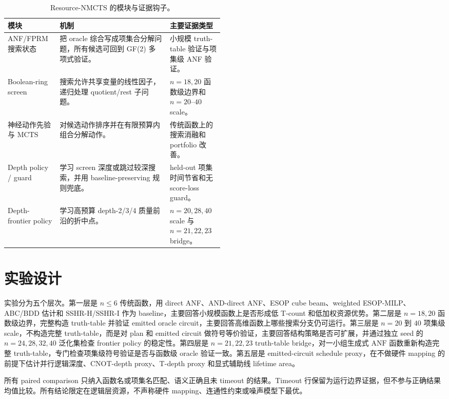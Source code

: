 \documentclass[UTF8,fontset=macnew,11pt]{ctexart}
\newcommand{\method}{Resource-NMCTS}
\newcommand{\anf}{\ensuremath{\mathrm{ANF}}}
\newcommand{\mcts}{\ensuremath{\mathrm{MCTS}}}
\newcommand{\ttable}{truth-table}
\begin{document}
\begin{table}[H]
\centering
\small
\caption{\method{} 的模块与证据钩子。}
\label{tab:modules}
\begin{tabularx}{\linewidth}{>{\raggedright\arraybackslash}p{0.24\linewidth}>{\raggedright\arraybackslash}X>{\raggedright\arraybackslash}p{0.25\linewidth}}
\toprule
模块 & 机制 & 主要证据类型 \\
\midrule
ANF/FPRM 搜索状态 & 把 oracle 综合写成项集合分解问题，所有候选可回到 GF(2) 多项式验证。 & 小规模 truth-table 验证与项集级 ANF 验证。 \\
Boolean-ring screen & 搜索允许共享变量的线性因子，递归处理 quotient/rest 子问题。 & $n=18,20$ 函数级边界和 $n=20$--$40$ scale。 \\
神经动作先验与 \mcts{} & 对候选动作排序并在有限预算内组合分解动作。 & 传统函数上的搜索消融和 portfolio 改善。 \\
Depth policy / guard & 学习 screen 深度或跳过较深搜索，并用 baseline-preserving 规则兜底。 & held-out 项集时间节省和无 score-loss guard。 \\
Depth-frontier policy & 学习高预算 depth-2/3/4 质量前沿的折中点。 & $n=20,28,40$ scale 与 $n=21,22,23$ bridge。 \\
\bottomrule
\end{tabularx}
\end{table}

\section{实验设计}

实验分为五个层次。第一层是 $n\leq6$ 传统函数，用 direct ANF、AND-direct ANF、ESOP cube beam、weighted ESOP-MILP、ABC/BDD 估计和 SSHR-H/SSHR-I 作为 baseline，主要回答小规模函数上是否形成低 T-count 和低加权资源优势。第二层是 $n=18,20$ 函数级边界，完整构造 \ttable{} 并验证 emitted oracle circuit，主要回答高维函数上哪些搜索分支仍可运行。第三层是 $n=20$ 到 $40$ 项集级 scale，不构造完整 \ttable{}，而是对 plan 和 emitted circuit 做符号等价验证，主要回答结构策略是否可扩展，并通过独立 seed 的 $n=24,28,32,40$ 泛化集检查 frontier policy 的稳定性。第四层是 $n=21,22,23$ truth-table bridge，对一小组生成式 \anf{} 函数重新构造完整 \ttable{}，专门检查项集级符号验证是否与函数级 oracle 验证一致。第五层是 emitted-circuit schedule proxy，在不做硬件 mapping 的前提下估计并行逻辑深度、CNOT-depth proxy、T-depth proxy 和显式辅助线 lifetime area。

所有 paired comparison 只纳入函数名或项集名匹配、语义正确且未 timeout 的结果。Timeout 行保留为运行边界证据，但不参与正确结果均值比较。所有结论限定在逻辑层资源，不声称硬件 mapping、连通性约束或噪声模型下最优。
\end{document}
